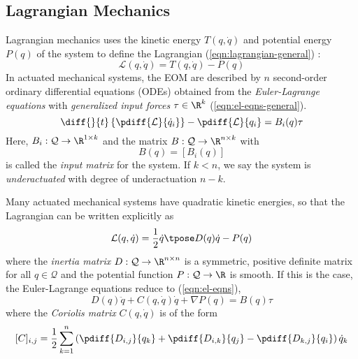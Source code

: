 \subsection{Lagrangian Mechanics}

Lagrangian mechanics uses the kinetic energy \(T(q,\dot{q})\) and potential
energy \(P(q)\) of the system to define the Lagrangian 
(\ref{eqn:lagrangian-general}) \cite{greenwood_dynamics}:
\begin{equation}\label{eqn:lagrangian-general}
    \mathcal{L}(q,\dot{q}) = T(q,\dot{q}) - P(q)
\end{equation}
In actuated mechanical systems, the EOM are described by \(n\) second-order
ordinary differential equations (ODEs) obtained from the \textit{Euler-Lagrange
equations} with \textit{generalized input forces} \(\tau \in \R^k\) 
(\ref{eqn:el-eqns-general}). 
\begin{equation}\label{eqn:el-eqns-general}
    \diff{}{t}\left\{ \pdiff{\mathcal{L}}{\dot{q}_i} \right\}
    - \pdiff{\mathcal{L}}{q_i} = B_i(q) \tau
\end{equation}
Here, \(B_i: \mathcal{Q} \rightarrow \R^{1\times k}\)
and the matrix  \(B: \mathcal{Q} \rightarrow \R^{n \times k}\) with
\[
    B(q) = [B_i(q)]
\]
is called the \textit{input matrix} for the system. 
If \(k < n\), we say the system is \textit{underactuated} with degree of
underactuation \(n - k\).

Many actuated mechanical systems have quadratic kinetic energies, so that the
Lagrangian can be written explicitly as
\begin{equation}\label{eqn:lagrangian}
    \mathcal{L}(q,\dot{q}) = \frac{1}{2} \dot{q}\tpose D(q) \dot{q} - P(q)
\end{equation}
where the \textit{inertia matrix} \(D: \mathcal{Q} \rightarrow \R^{n\times n}\) 
is a symmetric, positive definite matrix for all \(q \in \mathcal{Q}\) and the
potential function \(P : \mathcal{Q} \rightarrow \R\) is smooth. 
If this is the case, the Euler-Lagrange equations reduce to (\ref{eqn:el-eqns}),
\begin{equation}\label{eqn:el-eqns}
    D(q)\ddot{q} + C(q,\dot{q})\dot{q} + \nabla P(q) = B(q)\tau
\end{equation}
where the \textit{Coriolis matrix} \(C(q,\dot{q})\) is of the form
\[
    [C]_{i,j} = \frac{1}{2}\sum\limits_{k = 1}^n 
    \left(\pdiff{D_{i,j}}{q_k}  +
     \pdiff{D_{i,k}}{q_j} -
     \pdiff{D_{k,j}}{q_i}\right)\dot{q}_k
\]

